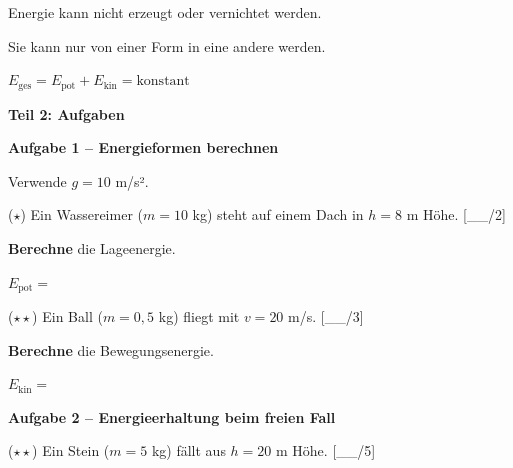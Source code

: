 \documentclass[11pt, a4paper]{article}
\newcommand{\luecke}[1]{\underline{\hspace{#1}}}
\newcommand{\punktebox}[1]{\hfill\small\textcolor{mittelgrau}{[\_\_/#1]}}
\newcommand{\aufgabe}[1]{%
    \needspace{4\baselineskip}%
    \vspace{10pt}%
    \noindent\textbf{\textcolor{fachfarbe}{Aufgabe #1}}%
    \vspace{4pt}%
    \nopagebreak[4]%
}
\newcommand{\operator}[1]{\textbf{\textcolor{fachfarbe}{#1}}}
\begin{document}
\begin{merkkasten}[title={\textbf{Kasten 4: Energieerhaltungssatz}}]
Energie kann nicht erzeugt oder vernichtet werden.

Sie kann nur von einer Form in eine andere \luecke{3cm} werden.

\vspace{6pt}
\begin{formelkasten}
\centering
\Large $E_\text{ges} = E_\text{pot} + E_\text{kin} = \text{konstant}$
\end{formelkasten}
\end{merkkasten}



\vspace{6pt}
\textbf{\large Teil 2: Aufgaben}

\aufgabe{1 – Energieformen berechnen}

Verwende $g = 10$ m/s².

\begin{teil}
\item ($\star$) Ein Wassereimer ($m = 10$ kg) steht auf einem Dach in $h = 8$ m Höhe. \punktebox{2}

\operator{Berechne} die Lageenergie.

\vspace{0.3em}
$E_\text{pot} = $ \luecke{8cm}

\vspace{0.8em}

\item ($\star\star$) Ein Ball ($m = 0{,}5$ kg) fliegt mit $v = 20$ m/s. \punktebox{3}

\operator{Berechne} die Bewegungsenergie.

\vspace{0.3em}
$E_\text{kin} = $ \luecke{8cm}
\end{teil}

\vspace{1em}

\newpage

\aufgabe{2 – Energieerhaltung beim freien Fall}

($\star\star$) Ein Stein ($m = 5$ kg) fällt aus $h = 20$ m Höhe. \punktebox{5}
\end{document}
